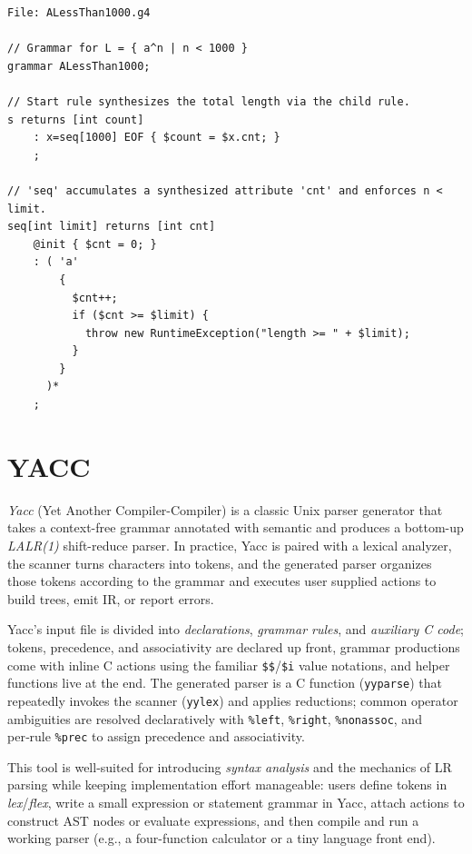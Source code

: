\begin{verbatim}
File: ALessThan1000.g4

// Grammar for L = { a^n | n < 1000 }
grammar ALessThan1000;

// Start rule synthesizes the total length via the child rule.
s returns [int count]
    : x=seq[1000] EOF { $count = $x.cnt; }
    ;

// 'seq' accumulates a synthesized attribute 'cnt' and enforces n < limit.
seq[int limit] returns [int cnt]
    @init { $cnt = 0; }
    : ( 'a'
        {
          $cnt++;
          if ($cnt >= $limit) {
            throw new RuntimeException("length >= " + $limit);
          }
        }
      )*
    ;

\end{verbatim}

\section{YACC} 

\textit{Yacc} (Yet Another Compiler-Compiler) is a classic Unix parser generator that takes a context-free grammar annotated with
semantic and produces a bottom-up \emph{LALR(1)} shift-reduce parser. In practice, Yacc is paired with a lexical analyzer, 
the scanner turns characters into tokens, and the generated parser organizes those tokens according to the grammar and executes 
user supplied actions to build trees, emit IR, or report errors. 

Yacc's input file is divided into \emph{declarations}, \emph{grammar rules}, and \emph{auxiliary C code}; tokens, precedence, 
and associativity are declared up front, grammar productions come with inline C actions using the familiar \verb|$$|/\verb|$i| 
value notations, and helper functions live at the end. The generated parser is a C function (\texttt{yyparse}) that repeatedly 
invokes the scanner (\texttt{yylex}) and applies reductions; common operator ambiguities are resolved declaratively 
with \verb|%left|, \verb|%right|, \verb|%nonassoc|, and per‑rule \verb|%prec| to assign precedence and associativity. 

This tool is well-suited for introducing \emph{syntax analysis} and the mechanics of LR parsing while keeping implementation 
effort manageable: users define tokens in \textit{lex}/\textit{flex}, write a small expression or statement grammar in Yacc, 
attach actions to construct AST nodes or evaluate expressions, and then compile and run a working parser 
(e.g., a four-function calculator or a tiny language front end). 


